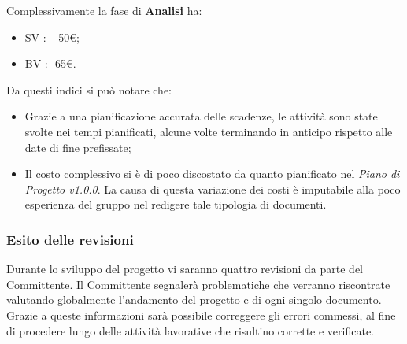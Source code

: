 Complessivamente la fase di \textbf{Analisi} ha:

\begin{itemize}
	\item SV : +50€;
	\item BV : -65€.
\end{itemize}

Da questi indici si può notare che:

\begin{itemize}
	\item Grazie a una pianificazione accurata delle scadenze, le attività 
	sono state svolte nei tempi pianificati, alcune volte terminando in 
	anticipo rispetto alle date di fine prefissate;
	\item Il costo complessivo si è di poco discostato da quanto pianificato nel 
	\textit{Piano di Progetto v1.0.0}. La causa di questa variazione dei costi è imputabile alla poco esperienza del gruppo nel redigere tale tipologia di documenti.
\end{itemize}

\subsubsection{Esito delle revisioni}

Durante lo sviluppo del progetto vi saranno quattro revisioni da parte del Committente. Il Committente segnalerà problematiche che verranno riscontrate valutando globalmente l'andamento del progetto e di ogni singolo documento. Grazie a queste informazioni sarà possibile correggere gli errori commessi, al fine di procedere lungo delle attività lavorative che risultino corrette e verificate.
